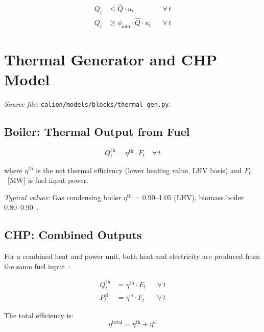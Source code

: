 \documentclass[a4paper,12pt]{article}
\begin{document}
\begin{align}
  Q_{t} &\leq \hat{Q} \cdot u_{t}              && \forall\, t \tag{P2H-2} \label{eq:p2h2} \\
  Q_{t} &\geq \phi_{\min} \cdot \hat{Q} \cdot u_{t} && \forall\, t \tag{P2H-3} \label{eq:p2h3}
\end{align}

\section{Thermal Generator and CHP Model}
\label{sec:gen}

\textit{Source file:} \texttt{calion/models/blocks/thermal\_gen.py}.

\subsection{Boiler: Thermal Output from Fuel}

\begin{equation}
  Q^{\text{th}}_{t} = \eta^{\text{th}} \cdot F_{t}
  \quad \forall\, t
  \tag{GEN-1}
  \label{eq:gen1}
\end{equation}

where $\eta^{\text{th}}$ is the net thermal efficiency (lower heating value, LHV basis) and
$F_{t}$~[MW] is fuel input power.

\noindent\textit{Typical values:} Gas condensing boiler $\eta^{\text{th}}$ = 0.90–1.05
(LHV), biomass boiler 0.80–0.90~\cite{Eurostat2023}.

\subsection{CHP: Combined Outputs}

For a combined heat and power unit, both heat and electricity are produced from the same
fuel input~\cite{Morales2014}:

\begin{align}
  Q^{\text{th}}_{t} &= \eta^{\text{th}} \cdot F_{t} && \forall\, t \tag{GEN-2} \label{eq:gen2} \\
  P^{\text{el}}_{t} &= \eta^{\text{el}} \cdot F_{t} && \forall\, t \tag{GEN-3} \label{eq:gen3}
\end{align}

The total efficiency is:
\begin{equation}
  \eta^{\text{total}} = \eta^{\text{th}} + \eta^{\text{el}}
  \label{eq:total-eff}
\end{equation}
\end{document}
